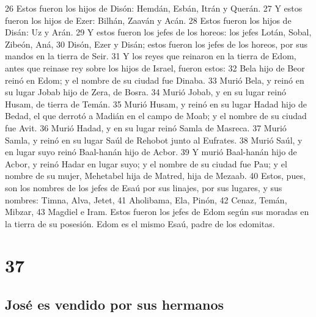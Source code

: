 26 Estos fueron los hijos de Disón: Hemdán, Esbán, Itrán y Querán.
27 Y estos fueron los hijos de Ezer: Bilhán, Zaaván y Acán.
28 Estos fueron los hijos de Disán: Uz y Arán.
29 Y estos fueron los jefes de los horeos: los jefes Lotán, Sobal, Zibeón, Aná,
30 Disón, Ezer y Disán; estos fueron los jefes de los horeos, por sus mandos en la tierra de Seir.
31 Y los reyes que reinaron en la tierra de Edom, antes que reinase rey sobre los hijos de Israel, fueron estos:
32 Bela hijo de Beor reinó en Edom; y el nombre de su ciudad fue Dinaba.
33 Murió Bela, y reinó en su lugar Jobab hijo de Zera, de Bosra.
34 Murió Jobab, y en su lugar reinó Husam, de tierra de Temán.
35 Murió Husam, y reinó en su lugar Hadad hijo de Bedad, el que derrotó a Madián en el campo de Moab; y el nombre de su ciudad fue Avit.
36 Murió Hadad, y en su lugar reinó Samla de Masreca.
37 Murió Samla, y reinó en su lugar Saúl de Rehobot junto al Eufrates.
38 Murió Saúl, y en lugar suyo reinó Baal-hanán hijo de Acbor.
39 Y murió Baal-hanán hijo de Acbor, y reinó Hadar en lugar suyo; y el nombre de su ciudad fue Pau; y el nombre de su mujer, Mehetabel hija de Matred, hija de Mezaab.
40 Estos, pues, son los nombres de los jefes de Esaú por sus linajes, por sus lugares, y sus nombres: Timna, Alva, Jetet,
41 Aholibama, Ela, Pinón,
42 Cenaz, Temán, Mibzar,
43 Magdiel e Iram. Estos fueron los jefes de Edom según sus moradas en la tierra de su posesión. Edom es el mismo Esaú, padre de los edomitas.

\chapter{37}

\section*{José es vendido por sus hermanos}

